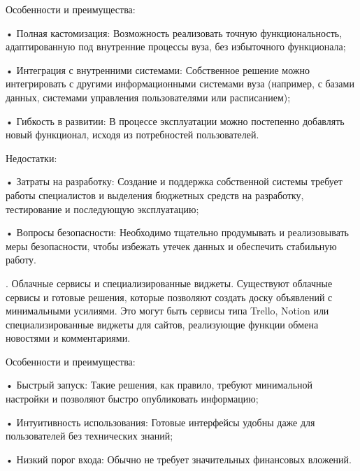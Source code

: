 {	\par \redline Особенности и преимущества:
	
	\par \redline • Полная кастомизация: Возможность реализовать точную функциональность, адаптированную под внутренние процессы вуза, без избыточного функционала;
	
	\par \redline • Интеграция с внутренними системами: Собственное решение можно интегрировать с другими информационными системами вуза (например, с базами данных, системами управления пользователями или расписанием);
	
	\par \redline • Гибкость в развитии: В процессе эксплуатации можно постепенно добавлять новый функционал, исходя из потребностей пользователей.
	
	\par \redline Недостатки:
	
	\par \redline • Затраты на разработку: Создание и поддержка собственной системы требует работы специалистов и выделения бюджетных средств на разработку, тестирование и последующую эксплуатацию;
	
	\par \redline • Вопросы безопасности: Необходимо тщательно продумывать и реализовывать меры безопасности, чтобы избежать утечек данных и обеспечить стабильную работу.   
	
	\par {}. Облачные сервисы и специализированные виджеты. Существуют облачные сервисы и готовые решения, которые позволяют создать доску объявлений с минимальными усилиями. Это могут быть сервисы типа Trello, Notion или специализированные виджеты для сайтов, реализующие функции обмена новостями и комментариями.
	
	\par \redline Особенности и преимущества:
	
	\par \redline • Быстрый запуск: Такие решения, как правило, требуют минимальной настройки и позволяют быстро опубликовать информацию;
	
	\par \redline • Интуитивность использования: Готовые интерфейсы удобны даже для пользователей без технических знаний;
	
	\par \redline • Низкий порог входа: Обычно не требует значительных финансовых вложений.
	
}
